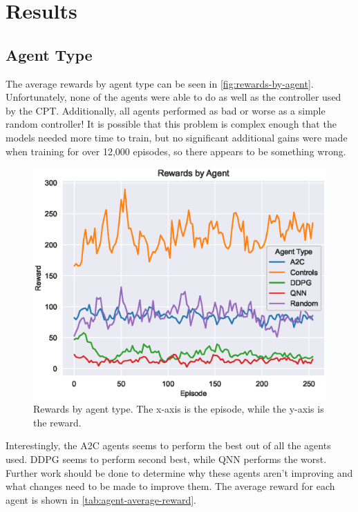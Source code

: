 \section{Results}\label{sec:results}

\subsection{Agent Type}\label{subsec:agent-type}
The average rewards by agent type can be seen in \autoref{fig:rewards-by-agent}.
Unfortunately, none of the agents were able to do as well as the controller used by the
CPT\@.
Additionally, all agents performed as bad or worse as a simple random controller!
It is possible that this problem is complex enough that the models needed more time
to train, but no significant additional gains were made when training for over 12,000
episodes, so there appears to be something wrong.

\begin{figure}[!ht]
    \centering
    \includegraphics[scale=0.5]
    {./figures/rewards-by-agent}
    \caption{
        Rewards by agent type.
        The x-axis is the episode, while the y-axis is the reward.
    }
    \label{fig:rewards-by-agent}
\end{figure}

Interestingly, the A2C agents seems to perform the best out of all the agents used.
DDPG seems to perform second best, while QNN performs the worst.
Further work should be done to determine why these agents aren't improving and what
changes need to be made to improve them.
The average reward for each agent is shown in \autoref{tab:agent-average-reward}.

